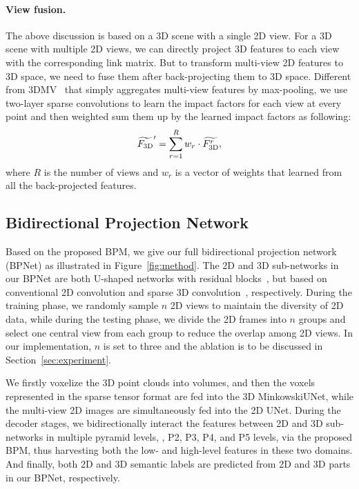 \documentclass[final]{cvpr}
\begin{document}
\paragraph{View fusion.}
The above discussion is based on a 3D scene with a single 2D view.
For a 3D scene with multiple 2D views, we can directly project 3D features to each view with the corresponding link matrix.
But to transform multi-view 2D features to 3D space, we need to fuse them after back-projecting them to 3D space.
Different from 3DMV~\cite{dai20183dmv} that simply aggregates multi-view features by max-pooling, we use two-layer sparse convolutions to learn the impact factors for each view at every point and then weighted sum them up by the learned impact factors as following:
	\vspace{-2mm}
\begin{equation}
	\widetilde{F_\text{3D}}^{\prime} = \sum_{r=1}^{R}w_r \cdot \widetilde{F_\text{3D}^r},
	\vspace{-2mm}
\end{equation}
where $R$ is the number of views and $w_r$ is a vector of weights that learned from all the back-projected features.


\subsection{Bidirectional Projection Network}
\vspace{-1mm}
Based on the proposed BPM, we give our full bidirectional projection network (BPNet) as illustrated in Figure~\ref{fig:method}. The 2D and 3D sub-networks in our BPNet are both U-shaped networks with residual blocks~\cite{he2016deep}, but based on conventional 2D convolution and sparse 3D convolution~\cite{sscn2018}, respectively. 
During the training phase, we randomly sample $n$ 2D views to maintain the diversity of 2D data, while during the testing phase, we divide the 2D frames into $n$ groups and select one central view from each group to reduce the overlap among 2D views.
In our implementation, $n$ is set to three and the ablation is to be discussed in Section~\ref{sec:experiment}.

We firstly voxelize the 3D point clouds into volumes, and then the voxels represented in the sparse tensor format are fed into the 3D MinkowskiUNet, while the multi-view 2D images are simultaneously fed into the 2D UNet. 
During the decoder stages, we bidirectionally interact the features between 2D and 3D sub-networks in multiple pyramid levels, \ie, P2, P3, P4, and P5 levels, via the proposed BPM, thus harvesting both the low- and high-level features in these two domains. And finally, both 2D and 3D semantic labels are predicted from 2D and 3D parts in our BPNet, respectively.
\end{document}
